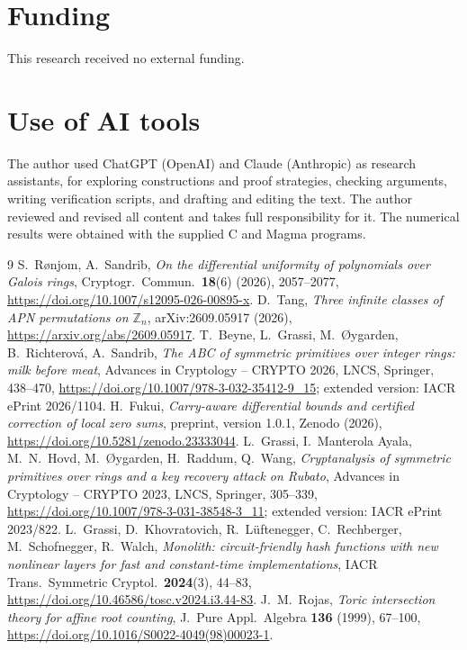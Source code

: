 \documentclass[11pt]{amsart}
\theoremstyle{definition}
\begin{document}
\section*{Funding}
This research received no external funding.

\section*{Use of AI tools}
The author used ChatGPT (OpenAI) and Claude (Anthropic) as research assistants, for exploring constructions and proof strategies,
checking arguments, writing verification scripts, and drafting and editing the text. The author reviewed and revised all content
and takes full responsibility for it. The numerical results were obtained with the supplied C and Magma programs.

\begin{thebibliography}{9}
 S.~R{\o}njom, A.~Sandrib, \emph{On the differential uniformity of polynomials over Galois rings}, Cryptogr.\ Commun.\
\textbf{18}(6) (2026), 2057--2077, \url{https://doi.org/10.1007/s12095-026-00895-x}.
\bibitem{Tang} D.~Tang, \emph{Three infinite classes of APN permutations on $\mathbb Z_n$}, arXiv:2609.05917 (2026), \url{https://arxiv.org/abs/2609.05917}.
\bibitem{BGORS} T.~Beyne, L.~Grassi, M.~{\O}ygarden, B.~Richterov\'a, A.~Sandrib, \emph{The ABC of symmetric primitives over integer rings:
milk before meat}, Advances in Cryptology -- CRYPTO 2026, LNCS, Springer, 438--470, \url{https://doi.org/10.1007/978-3-032-35412-9_15};
extended version: IACR ePrint 2026/1104.
 H.~Fukui, \emph{Carry-aware differential bounds and certified correction of local zero sums}, preprint, version 1.0.1,
Zenodo (2026), \url{https://doi.org/10.5281/zenodo.23333044}.
 L.~Grassi, I.~Manterola Ayala, M.~N.~Hovd, M.~{\O}ygarden, H.~Raddum, Q.~Wang, \emph{Cryptanalysis of symmetric
primitives over rings and a key recovery attack on Rubato}, Advances in Cryptology -- CRYPTO 2023, LNCS, Springer, 305--339,
\url{https://doi.org/10.1007/978-3-031-38548-3_11}; extended version: IACR ePrint 2023/822.
\bibitem{Monolith} L.~Grassi, D.~Khovratovich, R.~L\"uftenegger, C.~Rechberger, M.~Schofnegger, R.~Walch, \emph{Monolith:
circuit-friendly hash functions with new nonlinear layers for fast and constant-time implementations}, IACR Trans.\ Symmetric
Cryptol.\ \textbf{2024}(3), 44--83, \url{https://doi.org/10.46586/tosc.v2024.i3.44-83}.
\bibitem{Rojas} J.~M.~Rojas, \emph{Toric intersection theory for affine root counting}, J.\ Pure Appl.\ Algebra \textbf{136} (1999), 67--100, \url{https://doi.org/10.1016/S0022-4049(98)00023-1}.
\end{thebibliography}
\end{document}
